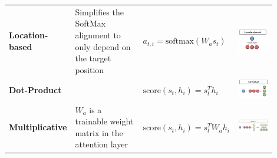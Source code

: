 \documentclass[11pt]{article}
\begin{document}
\begin{tabularx}{\linewidth}{m{0.1\linewidth} m{0.3\linewidth} m{0.3\linewidth} m{0.2\linewidth} }
	\textbf{Location-based} & Simplifies the SoftMax alignment to only depend on the target position \parencite{luong2015effective} & $ a_{t,i} = \text{softmax}\left(W_a s_t\right) $ & \includegraphics[width=\linewidth]{img/attention_location.png}\\
	\textbf{Dot-Product} & \parencite{luong2015effective} & $\text{score}(s_t,h_i) = s_t^T h_i $ & \includegraphics[width=\linewidth]{img/attention_dotp.png}\\
	\textbf{Multi\-plicative} & $W_a$ is a trainable weight matrix in the attention layer \parencite{luong2015effective} & $ \text{score}(s_t,h_i) = s_t^T W_a h_i $ & \includegraphics[width=\linewidth]{img/attention_multiplicative.png}\\

\end{tabularx}
\end{document}
